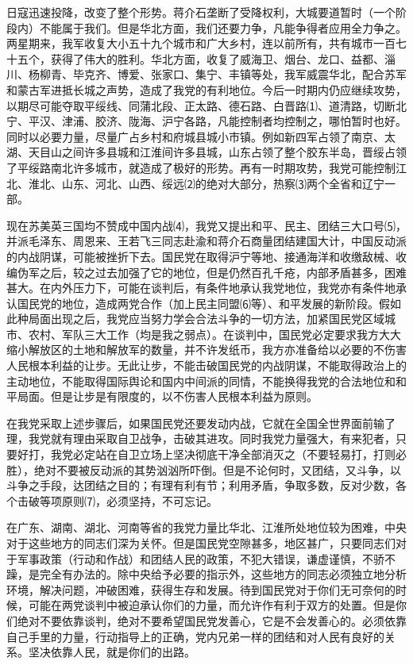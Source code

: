 \documentclass[UTF-8, a5paper, 12pt]{ctexart}
\begin{document}
日寇迅速投降，改变了整个形势。蒋介石垄断了受降权利，大城要道暂时（一个阶段内）不能属于我们。但是华北方面，我们还要力争，凡能争得者应用全力争之。两星期来，我军收复大小五十九个城市和广大乡村，连以前所有，共有城市一百七十五个，获得了伟大的胜利。华北方面，收复了威海卫、烟台、龙口、益都、淄川、杨柳青、毕克齐、博爱、张家口、集宁、丰镇等处，我军威震华北，配合苏军和蒙古军进抵长城之声势，造成了我党的有利地位。今后一时期内仍应继续攻势，以期尽可能夺取平绥线、同蒲北段、正太路、德石路、白晋路⑴、道清路，切断北宁、平汉、津浦、胶济、陇海、沪宁各路，凡能控制者均控制之，哪怕暂时也好。同时以必要力量，尽量广占乡村和府城县城小市镇。例如新四军占领了南京、太湖、天目山之间许多县城和江淮间许多县城，山东占领了整个胶东半岛，晋绥占领了平绥路南北许多城市，就造成了极好的形势。再有一时期攻势，我党可能控制江北、淮北、山东、河北、山西、绥远⑵的绝对大部分，热察⑶两个全省和辽宁一部。

现在苏美英三国均不赞成中国内战⑷，我党又提出和平、民主、团结三大口号⑸，并派毛泽东、周恩来、王若飞三同志赴渝和蒋介石商量团结建国大计，中国反动派的内战阴谋，可能被挫折下去。国民党在取得沪宁等地、接通海洋和收缴敌械、收编伪军之后，较之过去加强了它的地位，但是仍然百孔千疮，内部矛盾甚多，困难甚大。在内外压力下，可能在谈判后，有条件地承认我党地位，我党亦有条件地承认国民党的地位，造成两党合作（加上民主同盟⑹等）、和平发展的新阶段。假如此种局面出现之后，我党应当努力学会合法斗争的一切方法，加紧国民党区域城市、农村、军队三大工作（均是我之弱点）。在谈判中，国民党必定要求我方大大缩小解放区的土地和解放军的数量，并不许发纸币，我方亦准备给以必要的不伤害人民根本利益的让步。无此让步，不能击破国民党的内战阴谋，不能取得政治上的主动地位，不能取得国际舆论和国内中间派的同情，不能换得我党的合法地位和和平局面。但是让步是有限度的，以不伤害人民根本利益为原则。

在我党采取上述步骤后，如果国民党还要发动内战，它就在全国全世界面前输了理，我党就有理由采取自卫战争，击破其进攻。同时我党力量强大，有来犯者，只要好打，我党必定站在自卫立场上坚决彻底干净全部消灭之（不要轻易打，打则必胜），绝对不要被反动派的其势汹汹所吓倒。但是不论何时，又团结，又斗争，以斗争之手段，达团结之目的；有理有利有节；利用矛盾，争取多数，反对少数，各个击破等项原则⑺，必须坚持，不可忘记。

在广东、湖南、湖北、河南等省的我党力量比华北、江淮所处地位较为困难，中央对于这些地方的同志们深为关怀。但是国民党空隙甚多，地区甚广，只要同志们对于军事政策（行动和作战）和团结人民的政策，不犯大错误，谦虚谨慎，不骄不躁，是完全有办法的。除中央给予必要的指示外，这些地方的同志必须独立地分析环境，解决问题，冲破困难，获得生存和发展。待到国民党对于你们无可奈何的时候，可能在两党谈判中被迫承认你们的力量，而允许作有利于双方的处置。但是你们绝对不要依靠谈判，绝对不要希望国民党发善心，它是不会发善心的。必须依靠自己手里的力量，行动指导上的正确，党内兄弟一样的团结和对人民有良好的关系。坚决依靠人民，就是你们的出路。
\end{document}
